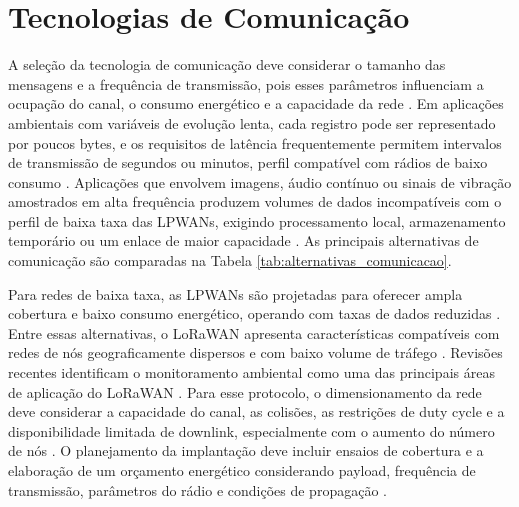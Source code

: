 \section{Tecnologias de Comunicação}

A seleção da tecnologia de comunicação deve considerar o tamanho das mensagens e a frequência de transmissão, pois esses parâmetros influenciam a ocupação do canal, o consumo energético e a capacidade da rede \cite{7815384,8030482}.
Em aplicações ambientais com variáveis de evolução lenta, cada registro pode ser representado por poucos bytes, e os requisitos de latência frequentemente permitem intervalos de transmissão de segundos ou minutos, perfil compatível com rádios de baixo consumo \cite{7815384,s23146332}.
Aplicações que envolvem imagens, áudio contínuo ou sinais de vibração amostrados em alta frequência produzem volumes de dados incompatíveis com o perfil de baixa taxa das LPWANs, exigindo processamento local, armazenamento temporário ou um enlace de maior capacidade \cite{5597912,10.1145/1134680.1134685,7815384}.
As principais alternativas de comunicação são comparadas na Tabela \ref{tab:alternativas_comunicacao}.

Para redes de baixa taxa, as LPWANs são projetadas para oferecer ampla cobertura e baixo consumo energético, operando com taxas de dados reduzidas \cite{7815384}.
Entre essas alternativas, o LoRaWAN apresenta características compatíveis com redes de nós geograficamente dispersos e com baixo volume de tráfego \cite{s23208440}.
Revisões recentes identificam o monitoramento ambiental como uma das principais áreas de aplicação do LoRaWAN \cite{s23208440}.
Para esse protocolo, o dimensionamento da rede deve considerar a capacidade do canal, as colisões, as restrições de duty cycle e a disponibilidade limitada de downlink, especialmente com o aumento do número de nós \cite{8030482}.
O planejamento da implantação deve incluir ensaios de cobertura e a elaboração de um orçamento energético considerando payload, frequência de transmissão, parâmetros do rádio e condições de propagação \cite{8030482,s23146332}.

